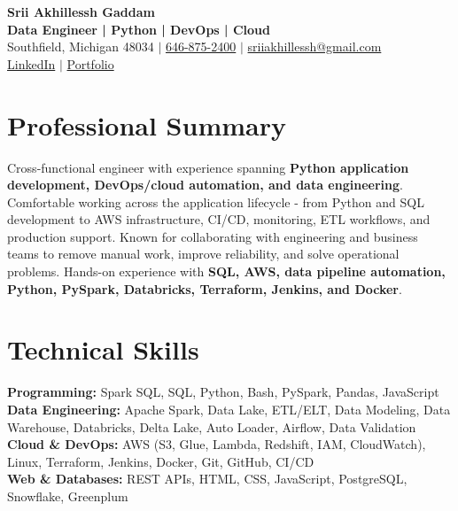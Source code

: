 \documentclass[letterpaper,10pt]{article}
\begin{document}
\fontsize{9.35pt}{10.45pt}\selectfont

\begin{center}
    {\LARGE \textbf{Srii Akhillessh Gaddam}} \\[-1pt]
    \textbf{Data Engineer | Python | DevOps | Cloud} \\[2pt]
    Southfield, Michigan 48034 $|$
    \href{tel:6468752400}{646-875-2400} $|$
    \href{mailto:sriiakhillessh@gmail.com}{sriiakhillessh@gmail.com} \\[1pt]
    \href{https://www.linkedin.com/in/srii-akhiilessh-gaddam-b48668191/}{LinkedIn} $|$
    \href{https://sriiakhillesshg.github.io/portfolio/}{Portfolio}
\end{center}
\vspace{-8pt}

\section{Professional Summary}
\small{Cross-functional engineer with experience spanning \textbf{Python application development, DevOps/cloud automation, and data engineering}. Comfortable working across the application lifecycle - from Python and SQL development to AWS infrastructure, CI/CD, monitoring, ETL workflows, and production support. Known for collaborating with engineering and business teams to remove manual work, improve reliability, and solve operational problems. Hands-on experience with \textbf{SQL, AWS, data pipeline automation, Python, PySpark, Databricks, Terraform, Jenkins, and Docker}.}

\section{Technical Skills}
\small{
\textbf{Programming:} Spark SQL, SQL, Python, Bash, PySpark, Pandas, JavaScript \\
\textbf{Data Engineering:} Apache Spark, Data Lake, ETL/ELT, Data Modeling, Data Warehouse, Databricks, Delta Lake, Auto Loader, Airflow, Data Validation \\
\textbf{Cloud \& DevOps:} AWS (S3, Glue, Lambda, Redshift, IAM, CloudWatch), Linux, Terraform, Jenkins, Docker, Git, GitHub, CI/CD \\
\textbf{Web \& Databases:} REST APIs, HTML, CSS, JavaScript, PostgreSQL, Snowflake, Greenplum
}
\end{document}
